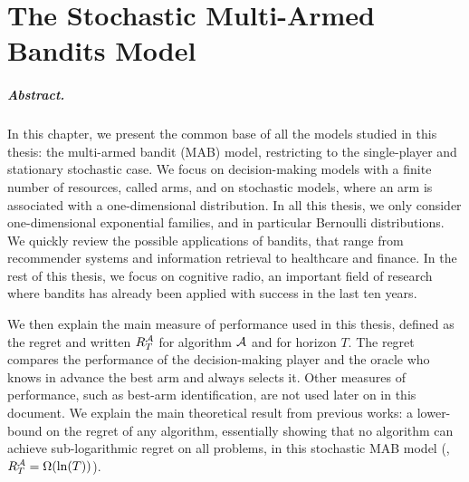 
\chapter{The Stochastic Multi-Armed Bandits Model}
\label{chapter:2}
\minitoc
\graphicspath{{2-Chapters/2-Chapter/Images/}}

\newpage

\paragraph{Abstract.}
%
In this chapter, we present the common base of all the models studied in this thesis:
the multi-armed bandit (MAB) model,
restricting to the single-player and stationary stochastic case.
We focus on decision-making models with a finite number of resources, called arms, and on stochastic models, where an arm is associated with a one-dimensional distribution.
In all this thesis, we only consider one-dimensional exponential families, and in particular Bernoulli distributions.
%
We quickly review the possible applications of bandits, that range from recommender systems and information retrieval to healthcare and finance. In the rest of this thesis, we focus on cognitive radio, an important field of research where bandits has already been applied with success in the last ten years.

We then explain the main measure of performance used in this thesis, defined as the regret and written $R_T^{\mathcal{A}}$ for algorithm $\mathcal{A}$ and for horizon $T$. The regret compares the performance of the decision-making player and the oracle who knows in advance the best arm and always selects it.
Other measures of performance, such as best-arm identification, are not used later on in this document.
%
We explain the main theoretical result from previous works: a lower-bound on the regret of any algorithm, essentially showing that no algorithm can achieve sub-logarithmic regret on all problems, in this stochastic MAB model (\ie, $R_T^{\mathcal{A}} = \Omega(\ln(T))$).

